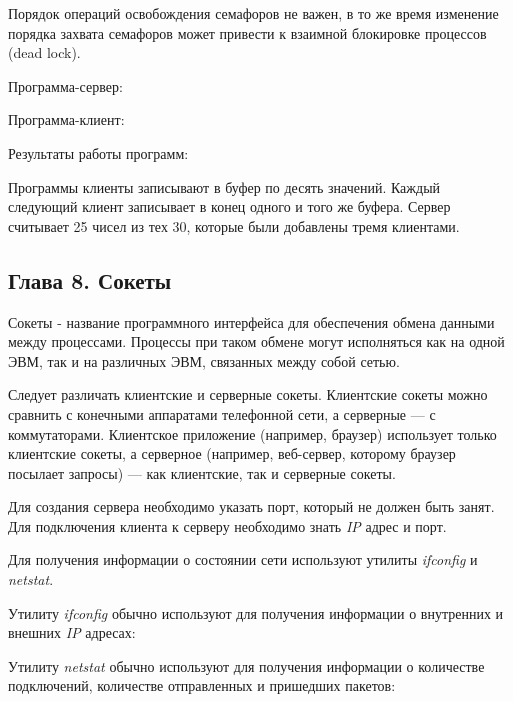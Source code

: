 \documentclass[14pt,a4paper,report]{report}
\begin{document}
Порядок операций освобождения семафоров не важен, в то же время изменение порядка захвата семафоров может привести к взаимной блокировке процессов (dead lock).

Программа-сервер:



Программа-клиент:



Результаты работы программ:









Программы клиенты записывают в буфер по десять значений. Каждый следующий клиент записывает в конец одного и того же буфера. Сервер считывает 25 чисел из тех 30, которые были добавлены тремя клиентами.

\subsection{Глава 8. Сокеты} 

Сокеты - название программного интерфейса для обеспечения обмена данными между процессами. Процессы при таком обмене могут исполняться как на одной ЭВМ, так и на различных ЭВМ, связанных между собой сетью.

Следует различать клиентские и серверные сокеты. Клиентские сокеты можно сравнить с конечными аппаратами телефонной сети, а серверные — с коммутаторами. Клиентское приложение (например, браузер) использует только клиентские сокеты, а серверное (например, веб-сервер, которому браузер посылает запросы) — как клиентские, так и серверные сокеты.

Для создания сервера необходимо указать порт, который не должен быть занят. Для подключения клиента к серверу необходимо знать \emph{IP} адрес и порт. 

Для получения информации о состоянии сети используют утилиты \emph{ifconfig} и \emph{netstat}. 

Утилиту \emph{ifconfig} обычно используют для получения информации о внутренних и внешних \emph{IP} адресах:



Утилиту \emph{netstat} обычно используют для получения информации о количестве подключений, количестве отправленных и пришедших пакетов: 
\end{document}
